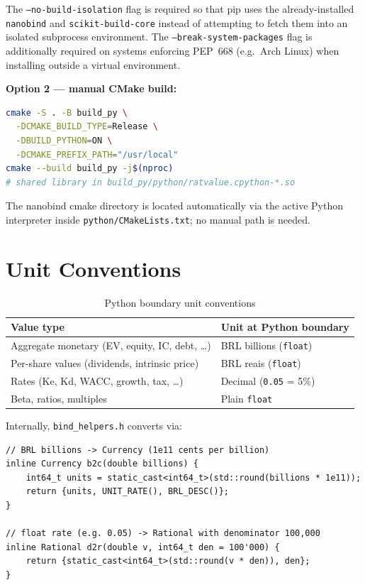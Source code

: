 \documentclass[12pt, a4paper, oneside]{book}
\begin{document}
The \texttt{--no-build-isolation} flag is required so that pip uses the
already-installed \texttt{nanobind} and \texttt{scikit-build-core} instead
of attempting to fetch them into an isolated subprocess environment.
The \texttt{--break-system-packages} flag is additionally required on
systems enforcing PEP~668 (e.g.\ Arch Linux) when installing outside a
virtual environment.

\textbf{Option 2 --- manual CMake build:}
\begin{lstlisting}[style=cpp, language=bash, numbers=none]
cmake -S . -B build_py \
  -DCMAKE_BUILD_TYPE=Release \
  -DBUILD_PYTHON=ON \
  -DCMAKE_PREFIX_PATH="/usr/local"
cmake --build build_py -j$(nproc)
# shared library in build_py/python/ratvalue.cpython-*.so
\end{lstlisting}

The nanobind cmake directory is located automatically via the active Python
interpreter inside \texttt{python/CMakeLists.txt}; no manual path is needed.

\section{Unit Conventions}

\begin{table}[h]
\centering
\caption{Python boundary unit conventions}
\begin{tabular}{ll}
\toprule
\textbf{Value type} & \textbf{Unit at Python boundary} \\
\midrule
Aggregate monetary (EV, equity, IC, debt, \ldots) & BRL billions (\texttt{float}) \\
Per-share values (dividends, intrinsic price) & BRL reais (\texttt{float}) \\
Rates (Ke, Kd, WACC, growth, tax, \ldots) & Decimal (\texttt{0.05} = 5\%) \\
Beta, ratios, multiples & Plain \texttt{float} \\
\bottomrule
\end{tabular}
\end{table}

Internally, \texttt{bind\_helpers.h} converts via:

\begin{lstlisting}[style=cpp, caption={Python boundary converters (bind\_helpers.h)}]
// BRL billions -> Currency (1e11 cents per billion)
inline Currency b2c(double billions) {
    int64_t units = static_cast<int64_t>(std::round(billions * 1e11));
    return {units, UNIT_RATE(), BRL_DESC()};
}

// float rate (e.g. 0.05) -> Rational with denominator 100,000
inline Rational d2r(double v, int64_t den = 100'000) {
    return {static_cast<int64_t>(std::round(v * den)), den};
}
\end{lstlisting}
\end{document}

